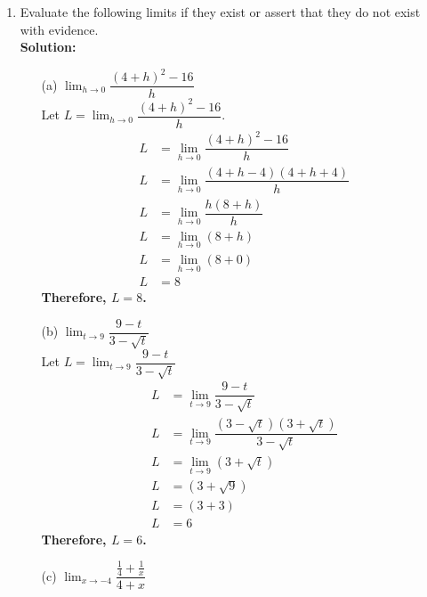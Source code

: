 \documentclass[12pt]{book}
\begin{document}
\begin{enumerate}

\newpage

\item Evaluate the following limits if they exist or assert that they do not exist with evidence.\\

\textbf{Solution:}
\begin{enumerate}
\item[(a)] $\lim_{h\to 0}\limits \dfrac{(4+h)^2 -16}{h}$ \\
Let $L = \lim_{h\to 0}\limits \dfrac{(4+h)^2 -16}{h}$.
\begin{align}
    L &= \lim_{h\to 0}\limits \dfrac{(4+h)^2 -16}{h} \\
    L &= \lim_{h\to 0}\limits \dfrac{(4+h - 4)(4+h + 4)}{h} \\
    L &= \lim_{h\to 0}\limits \dfrac{h(8+h)}{h} \\
    L &= \lim_{h\to 0}\limits (8+h) \\
    L &= \lim_{h\to 0}\limits (8+0) \\
    L &=  8
\end{align}
\textbf{Therefore, $L = 8$.}\\
\setcounter{equation}{0}
\item[(b)] $\lim_{t\to 9}\limits \dfrac{9-t}{3-\sqrt{t}}$ \\
Let $L = \lim_{t\to 9}\limits \dfrac{9-t}{3-\sqrt{t}}$
\begin{align}
    L &= \lim_{t\to 9}\limits \dfrac{9-t}{3-\sqrt{t}} \\
    L &= \lim_{t\to 9}\limits \dfrac{(3-\sqrt{t})(3+\sqrt{t})}{3-\sqrt{t}} \\
    L &= \lim_{t\to 9}\limits (3+\sqrt{t})\\
    L &= (3+\sqrt{9})\\
    L &= (3+ 3)\\
    L &= 6
\end{align}
\textbf{Therefore, $L = 6$.}\\
\setcounter{equation}{0}
\newpage
\item[(c)] $\lim_{x\to -4}\limits \dfrac{\frac{1}{4}+\frac{1}{x}}{4+x}$ \\

\end{enumerate}
\end{enumerate}
\end{document}
